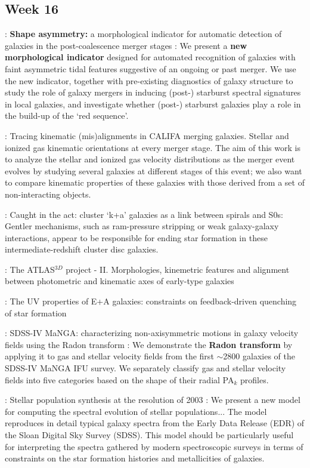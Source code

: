 \documentclass[ceqn,usenatbib,onecolumn]{mnras}
\begin{document}
\subsection{Week 16}
\par \citet{10.1093/mnras/stv2878} : {\textbf{Shape asymmetry:} a morphological indicator for automatic detection of galaxies in the post-coalescence merger stages} : We present a \textbf{new morphological indicator} designed for automated recognition of galaxies with faint asymmetric tidal features suggestive of an ongoing or past merger. We use the new indicator, together with pre-existing diagnostics of galaxy structure to study the role of galaxy mergers in inducing (post-) starburst spectral signatures in local galaxies, and investigate whether (post-) starburst galaxies play a role in the build-up of the ‘red sequence’.
\par \citet{2015A&A...582A..21B} : {Tracing kinematic (mis)alignments in CALIFA merging galaxies. Stellar and ionized gas kinematic orientations at every merger stage}. The aim of this work is to analyze the stellar and ionized gas velocity distributions as the merger event evolves by studying several galaxies at different stages of this event; we also want to compare kinematic properties of these galaxies with those derived from a set of non-interacting objects. 
\par \citet{2014MNRAS.438.1038R}: {Caught in the act: cluster `k+a' galaxies as a link between spirals and S0s}: Gentler mechanisms, such as ram-pressure stripping or weak galaxy-galaxy interactions, appear to be responsible for ending star formation in these intermediate-redshift cluster disc galaxies.

\par \citet{2011MNRAS.414.2923K} : {The ATLAS$^{3D}$ project - II. Morphologies, kinemetric features and alignment between photometric and kinematic axes of early-type galaxies}
\par \citet{2007MNRAS.382..960K} : {The UV properties of E+A galaxies: constraints on feedback-driven quenching of star formation}
\par \citet{2018MNRAS.480.2217S} : {SDSS-IV MaNGA: characterizing non-axisymmetric motions in galaxy velocity fields using the Radon transform} :  We demonstrate the \textbf{Radon transform} by applying it to gas and stellar velocity fields from the first $\sim$2800 galaxies of the SDSS-IV MaNGA IFU survey. We separately classify gas and stellar velocity fields into five categories based on the shape of their radial PA$_k$ profiles. 
\par \citet{2003MNRAS.344.1000B} : {Stellar population synthesis at the resolution of 2003} : We present a new model for computing the spectral evolution of stellar populations... The model reproduces in detail typical galaxy spectra from the Early Data Release (EDR) of the Sloan Digital Sky Survey (SDSS). This model should be particularly useful for interpreting the spectra gathered by modern spectroscopic surveys in terms of constraints on the star formation histories and metallicities of galaxies.
\end{document}
